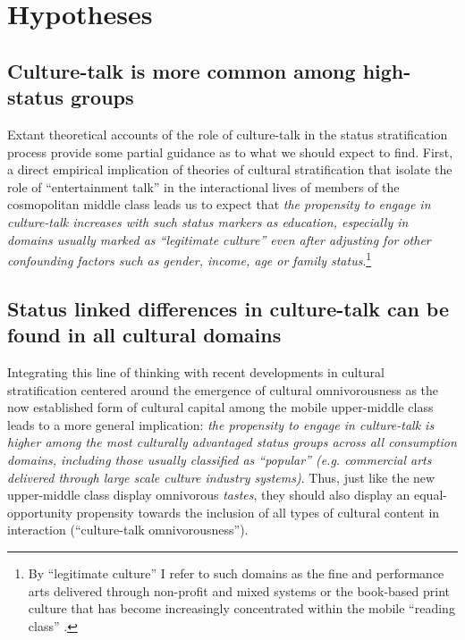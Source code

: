 \doublespacing
\section{Hypotheses}
\subsection{Culture-talk is more common among high-status groups}
Extant theoretical accounts of the role of culture-talk in the status stratification process provide some partial guidance as to what we should expect to find.  First, a direct empirical implication of theories of cultural stratification that isolate the role of ``entertainment talk'' in the interactional lives of members of the cosmopolitan middle class leads us to expect that \emph{the propensity to engage in culture-talk increases with such status markers as education, especially in domains usually marked as ``legitimate culture'' even after adjusting for other confounding factors such as gender, income, age or family status}.\footnote{By ``legitimate culture'' I refer to such domains as the fine and performance arts delivered through non-profit and mixed systems \citep{dimaggio00} or the book-based print culture that has become increasingly concentrated within the mobile ``reading class'' \citep{griswold08}.} 

\subsection{Status linked differences in culture-talk can be found in all cultural domains}
Integrating this line of thinking with recent developments in cultural stratification centered around the emergence of cultural omnivorousness as the now established form of cultural capital among the mobile upper-middle class \citep{ollivier04, katzgerro04, ollivier08, warde_etal08, peterson05, dimaggio96, vaneijck00} leads to a more general implication: \emph{the propensity to engage in culture-talk is higher among the most culturally advantaged status groups across all consumption domains, including those usually classified as ``popular'' (e.g. commercial arts delivered through large scale culture industry systems)}.  Thus, just like the new upper-middle class display omnivorous \emph{tastes}, they should also display an equal-opportunity propensity towards the inclusion of all types of cultural content in interaction (``culture-talk omnivorousness'').

